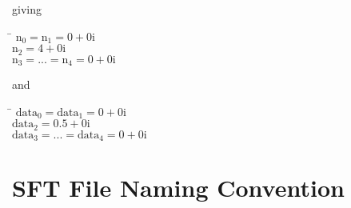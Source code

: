 \documentclass{ligodcc}
\begin{document}
giving
\begin{tabbing}
\hspace{2cm} \=  $\mathrm{n}_0 = \mathrm{n}_1 =0+0\mathrm{i}$\\
\> $\mathrm{n}_2 = 4+0\mathrm{i}$\\
\> $\mathrm{n}_3 =... = \mathrm{n}_4 = 0+0\mathrm{i}$\\
\end{tabbing}
and
\begin{tabbing}
\hspace{2cm} \= $\mathrm{data}_0 = \mathrm{data}_1 =0+0\mathrm{i}$\\
\> $\mathrm{data}_2= 0.5+0\mathrm{i}$\\
\> $\mathrm{data}_3 = ...= \mathrm{data}_4=0+0\mathrm{i}$\\
\end{tabbing}

\section{SFT File Naming Convention}
\end{document}
